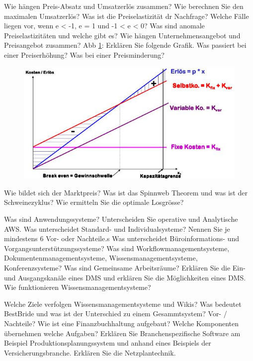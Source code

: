 \documentclass[ngerman,a4paper,12pt]{scrreprt}
\begin{document}
	\li Wie hängen Preis-Absatz und Umsatzerlös zusammen? Wie berechnen Sie den maximalen Umsatzerlös?
	\li Was ist die Preiselastizität dr Nachfrage? Welche Fälle liegen vor, wenn e < -1, e = 1 und -1 < e < 0? Was sind anomale Preiselastizitäten und welche gibt es?
	\li Wie hängen Unternehmensangebot und Preisangebot zusammen?
	\li Abb \ref{gewinnschwelle}: Erklären Sie folgende Grafik. Was passiert bei einer Preiserhöhung? Was bei einer Preisminderung?
 	\begin{figure}[htp]
		\centering
		\includegraphics[scale=0.60]{img/R3.3.jpg}
		\caption{}
		\label{gewinnschwelle}
	\end{figure}
	\li Wie bildet sich der Marktpreis?
	\li Was ist das Spinnweb Theorem und was ist der Schweinezyklus?
	\li Wie ermitteln Sie die optimale Losgrösse?
\olS


\olR
	\li Was sind Anwendungssysteme? Unterscheiden Sie operative und Analytische AWS.
	\li Was unterscheidet Standard- und Individualsysteme? Nennen Sie je mindestens 6 Vor- oder Nachteile.s
	\li Was unterscheidet Büroinformations- und Vorgangsunterstützungssysteme?
	\li Was sind Workflowmanagementsysteme, Dokumentenmanagementsysteme, Wissensmanagementsysteme, Konferenzsysteme?
	\li Was sind Gemeinsame Arbeitsräume?
	\li Erklären Sie die Ein- und Ausgangskanäle eines DMS und erklären Sie die Möglichkeiten eines DMS.
	\li Wie funktionieren Wissensmanagementsysteme?
\olS

\olR
	\li Welche Ziele verfolgen Wissensmanagementsysteme und Wikis?
	\li Was bedeutet BestBride und was ist der Unterschied zu einem Gesammtsystem? Vor- / Nachteile?
	\li Wie ist eine Finanzbuchhaltung aufgebaut? Welche Komponenten übernehmen welche Aufgaben?
	\li Erklären Sie Branchenspezifische Software am Beispiel Produktionsplanungssystem und anhand eines Beispiels der Versicherungsbranche.
	\li Erklären Sie die Netzplantechnik.
\olS
\end{document}

